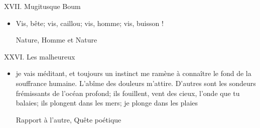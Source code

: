 \documentclass[french,a4paper,11pt,answers]{exam}
\newcommand{\cit}[2]{\og #1 \fg{} \begin{solution}{ #2 }\end{solution}} %
\begin{document}
	\begin{cadre}{XVII. Mugitusque Boum}
		\begin{itemize}
			\item \cit{Vis, bête; vis, caillou; vis, homme; vis, buisson !}
				{Nature, Homme et Nature}
		\end{itemize}
	\end{cadre}
	
	\begin{cadre}{XXVI. Les malheureux}
		\begin{itemize}
			\item \cit{je vais méditant, et toujours un instinct me ramène à connaître le fond de la souffrance humaine. L'abîme des douleurs m'attire. D'autres sont les sondeurs frémissants de l'océan profond; ils fouillent, vent des cieux, l'onde que tu balaies; ils plongent dans les mers; je plonge dans les plaies}
				{Rapport à l'autre, Quête poétique}
		\end{itemize}
	\end{cadre}
	
\end{document}
